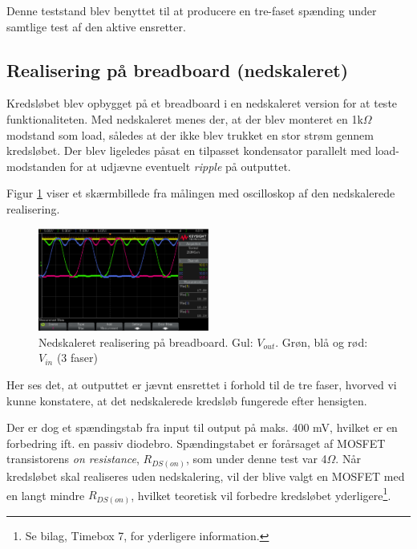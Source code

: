 Denne teststand blev benyttet til at producere en tre-faset spænding under samtlige test af den aktive ensretter.

\subsection{Realisering på breadboard (nedskaleret)}
\label{sec:real-pa-breadb}

Kredsløbet blev opbygget på et breadboard i en nedskaleret version for at teste funktionaliteten. Med nedskaleret menes der, at der blev monteret en 1k$\Omega$ modstand som load, således at der ikke blev trukket en stor strøm gennem kredsløbet. Der blev ligeledes påsat en tilpasset kondensator parallelt med load-modstanden for at udjævne eventuelt \textit{ripple} på outputtet. 

Figur \ref{fig:prens7} viser et skærmbillede fra målingen med oscilloskop af den nedskalerede realisering.

\begin{figure}[h]
  \centering
  \includegraphics[width=0.5\textwidth]{./figurer/prens7.png}
  \caption{Nedskaleret realisering på breadboard. Gul: $V_{out}$. Grøn, blå og rød: $V_{in}$ (3 faser)}
  \label{fig:prens7}
\end{figure}

Her ses det, at outputtet er jævnt ensrettet i forhold til de tre faser, hvorved vi kunne konstatere, at det nedskalerede kredsløb fungerede efter hensigten.

Der er dog et spændingstab fra input til output på maks. 400 mV, hvilket er en forbedring ift. en passiv diodebro. Spændingstabet er forårsaget af MOSFET transistorens \textit{on resistance}, $R_{DS(on)}$, som under denne test var 4$\Omega$. Når kredsløbet skal realiseres uden nedskalering, vil der blive valgt en MOSFET med en langt mindre $R_{DS(on)}$, hvilket teoretisk vil forbedre kredsløbet yderligere\footnote{Se bilag, Timebox 7, for yderligere information.}.  




